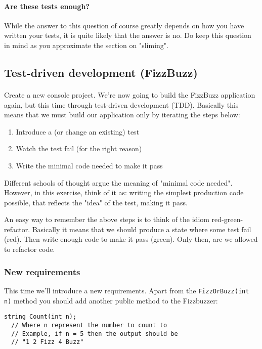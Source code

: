 \documentclass{article}
\begin{document}
    \paragraph{Are these tests enough?}
      While the answer to this question of course greatly depends on how you have written your tests, it is quite likely that the answer is no. Do keep this question in mind as you approximate the section on "sliming".

  \subsection{ Test-driven development (FizzBuzz) }
    \paragraph{}
      Create a new console project. We're now going to build the FizzBuzz application again, but this time through test-driven development (TDD). Basically this means that we must build our application only by iterating the steps below:
      \begin{enumerate}
        \item Introduce a (or change an existing) test
        \item Watch the test fail (for the right reason)
        \item Write the minimal code needed to make it pass
      \end{enumerate}

    Different schools of thought argue the meaning of "minimal code needed". However, in this exercise, think of it as: writing the simplest production code possible, that reflects the "idea" of the test, making it pass.

    An easy way to remember the above steps is to think of the idiom red-green-refactor. Basically it means that we should produce a state where some test fail (red). Then write enough code to make it pass (green). Only then, are we allowed to refactor code.

    \subsubsection*{New requirements}
    This time we'll introduce a new requirements. Apart from the \texttt{FizzOrBuzz(int n)} method you should add another public method to the Fizzbuzzer:

    \begin{lstlisting}
string Count(int n);
  // Where n represent the number to count to
  // Example, if n = 5 then the output should be
  // "1 2 Fizz 4 Buzz"
    \end{lstlisting}
\end{document}

